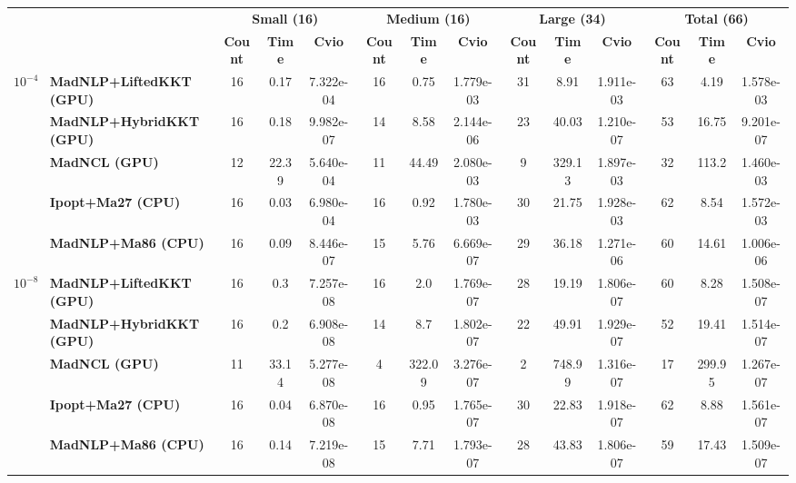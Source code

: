 \begin{center}
\renewcommand{\arraystretch}{0.9}
\begin{tabular}{|l|l|ccc|ccc|ccc|ccc|}
\hline
 & & \multicolumn{3}{c|}{\textbf{Small (16)}} & \multicolumn{3}{c|}{\textbf{Medium (16)}} & \multicolumn{3}{c|}{\textbf{Large (34)}} & \multicolumn{3}{c|}{\textbf{Total (66)}} \\
 & & \textbf{Count} & \textbf{Time} & \textbf{Cvio} & \textbf{Count} & \textbf{Time} & \textbf{Cvio} & \textbf{Count} & \textbf{Time} & \textbf{Cvio} & \textbf{Count} & \textbf{Time} & \textbf{Cvio}\\
\hline
\multirow{5}{*}{\Large\textbf{$10^{-4}$}} & \textbf{MadNLP+LiftedKKT (GPU)} & \cellcolor{blue!15}16 & 0.17 & 7.322e-04 & \cellcolor{blue!15}16 & \cellcolor{blue!15}0.75 & 1.779e-03 & \cellcolor{blue!15}31 & \cellcolor{blue!15}8.91 & 1.911e-03 & \cellcolor{blue!15}63 & \cellcolor{blue!15}4.19 & 1.578e-03 \\
 & \textbf{MadNLP+HybridKKT (GPU)} & \cellcolor{blue!15}16 & 0.18 & 9.982e-07 & 14 & 8.58 & 2.144e-06 & 23 & 40.03 & \cellcolor{blue!15}1.210e-07 & 53 & 16.75 & \cellcolor{blue!15}9.201e-07 \\
 & \textbf{MadNCL (GPU)} & 12 & 22.39 & 5.640e-04 & 11 & 44.49 & 2.080e-03 & 9 & 329.13 & 1.897e-03 & 32 & 113.2 & 1.460e-03 \\
 & \textbf{Ipopt+Ma27 (CPU)} & \cellcolor{blue!15}16 & \cellcolor{blue!15}0.03 & 6.980e-04 & \cellcolor{blue!15}16 & 0.92 & 1.780e-03 & 30 & 21.75 & 1.928e-03 & 62 & 8.54 & 1.572e-03 \\
 & \textbf{MadNLP+Ma86 (CPU)} & \cellcolor{blue!15}16 & 0.09 & \cellcolor{blue!15}8.446e-07 & 15 & 5.76 & \cellcolor{blue!15}6.669e-07 & 29 & 36.18 & 1.271e-06 & 60 & 14.61 & 1.006e-06 \\
\hline
\multirow{5}{*}{\Large\textbf{$10^{-8}$}} & \textbf{MadNLP+LiftedKKT (GPU)} & \cellcolor{blue!15}16 & 0.3 & 7.257e-08 & \cellcolor{blue!15}16 & 2.0 & 1.769e-07 & 28 & \cellcolor{blue!15}19.19 & 1.806e-07 & 60 & \cellcolor{blue!15}8.28 & 1.508e-07 \\
 & \textbf{MadNLP+HybridKKT (GPU)} & \cellcolor{blue!15}16 & 0.2 & 6.908e-08 & 14 & 8.7 & 1.802e-07 & 22 & 49.91 & 1.929e-07 & 52 & 19.41 & 1.514e-07 \\
 & \textbf{MadNCL (GPU)} & 11 & 33.14 & \cellcolor{blue!15}5.277e-08 & 4 & 322.09 & 3.276e-07 & 2 & 748.99 & \cellcolor{blue!15}1.316e-07 & 17 & 299.95 & \cellcolor{blue!15}1.267e-07 \\
 & \textbf{Ipopt+Ma27 (CPU)} & \cellcolor{blue!15}16 & \cellcolor{blue!15}0.04 & 6.870e-08 & \cellcolor{blue!15}16 & \cellcolor{blue!15}0.95 & \cellcolor{blue!15}1.765e-07 & \cellcolor{blue!15}30 & 22.83 & 1.918e-07 & \cellcolor{blue!15}62 & 8.88 & 1.561e-07 \\
 & \textbf{MadNLP+Ma86 (CPU)} & \cellcolor{blue!15}16 & 0.14 & 7.219e-08 & 15 & 7.71 & 1.793e-07 & 28 & 43.83 & 1.806e-07 & 59 & 17.43 & 1.509e-07 \\
\hline
\end{tabular}
\end{center}
